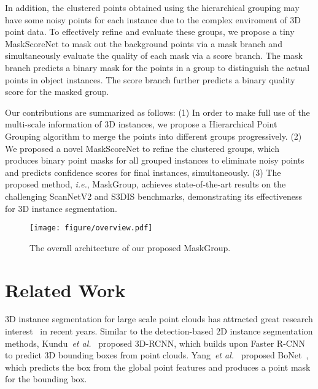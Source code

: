 \documentclass{article}
\newcommand{\etal}{\emph{et al.}}
\newcommand{\ie}{\emph{i.e.}}
\begin{document}
In addition, the clustered points obtained using the hierarchical grouping may have some noisy points for each instance due to the complex enviroment of 3D point data. To effectively refine and evaluate these groups, we propose a tiny MaskScoreNet to mask out the background points via a mask branch and simultaneously evaluate the quality of each mask via a score branch. The mask branch predicts a binary mask for the points in a group to distinguish the actual points in object instances. The score branch further predicts a binary quality score for the masked group.


Our contributions are summarized as follows: (1) In order to make full use of the multi-scale information of 3D instances, we propose a Hierarchical Point Grouping algorithm to merge the points into different groups progressively. (2) We proposed a novel  MaskScoreNet to refine the clustered groups, which produces binary point masks for all grouped instances to eliminate noisy points and predicts confidence scores for final instances, simultaneously. (3) The proposed method, \ie, MaskGroup, achieves state-of-the-art results on the challenging ScanNetV2 and S3DIS benchmarks, demonstrating its effectiveness for 3D instance segmentation.

\begin{figure*}
	\begin{center}
		\texttt{[image: figure/overview.pdf]}
	\end{center}
	\vspace{-4mm}
	\caption{The overall architecture of our proposed MaskGroup.}
	\label{fig:overview}
	\vspace{-5mm}
\end{figure*}

\section{Related Work}



3D instance segmentation for large scale point clouds has attracted great research interest~\cite{liang2021instance,chen2021hierarchical,pointgroup,occseg,3dmpa} in recent years.
Similar to the detection-based 2D instance segmentation methods, Kundu~\etal~\cite{3drcnn} proposed 3D-RCNN, which builds upon Faster R-CNN  to predict 3D bounding boxes from point clouds.
Yang~\etal~ proposed BoNet~\cite{3dbonet}, which predicts the box from the global point features and produces a point mask for the bounding box.
\end{document}
